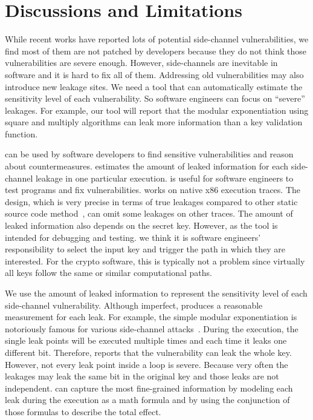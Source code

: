 \section{Discussions and Limitations}
While recent works have reported lots
of potential side-channel vulnerabilities, we find most of them are not patched by
developers because they do not think those vulnerabilities are severe enough.
However, side-channels are inevitable in software and it is hard to fix all of them. 
Addressing old vulnerabilities may also introduce new leakage
sites. We need a
tool that can automatically estimate the sensitivity level of each vulnerability.
So software engineers can focus on
``severe'' leakages. For example, our tool will report that 
the modular exponentiation using square and multiply algorithms can
leak more information than a key validation function.

\tool{} can be used by software developers to find sensitive vulnerabilities
and reason about countermeasures.
\tool{} estimates the amount of leaked information for each side-channel leakage
in one particular execution. \tool{} is useful for software
engineers to test programs and fix vulnerabilities.
\tool{} works on native x86 execution traces. The design, which is very
precise in terms of true leakages compared to other static source code
method~\cite{197207,BacelarAlmeida:2013:FVS:2483313.2483334}, can omit some
leakages on other traces. The amount of leaked information also depends on the secret key.
However, as the tool is intended for debugging and testing.
we think it is software engineers' responsibility to select the input key and trigger the 
path in which they are interested. For the crypto software, this is typically not
a problem since virtually all keys follow the same or similar computational paths.

We use the amount of leaked information to represent the sensitivity level of each
side-channel vulnerability. Although imperfect, \tool{} produces a reasonable
measurement for each leak. For example, the simple modular exponentiation is notoriously
famous for various side-channel attacks~\cite{kocher1996timing}. During the execution, the single 
leak points will be executed multiple times and each time it leaks one different bit.
Therefore, \tool{} reports that the vulnerability can leak the whole key. However, not every
leak point inside a loop is severe. Because very often the leakages may leak the same
bit in the original key and those leaks are not independent. \tool{} can capture the most 
fine-grained information by
modeling each leak during the execution 
as a math formula and by using the conjunction of those formulas to describe the total effect.

